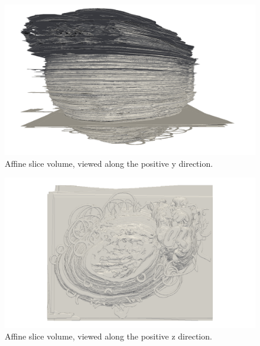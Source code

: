 	\begin{figure}
	  \centering
	  \includegraphics[width=0.9\textheight]{Ch7/Figs/Rat28/contours/whole_positive_y_affine}
	  \caption{Affine slice volume, viewed along the positive y direction.}
	  \label{fig:positive_y_affine_contour}
	\end{figure}

	\begin{figure}
	  \centering
	  \includegraphics[width=0.9\textheight]{Ch7/Figs/Rat28/contours/whole_positive_z_affine}
	  \caption{Affine slice volume, viewed along the positive z direction.}
	  \label{fig:positive_z_affine_contour}
	\end{figure}
	
